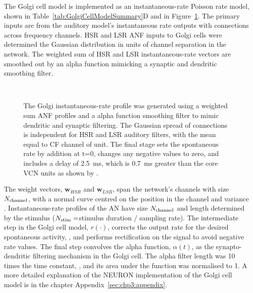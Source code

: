 % 

\smallskip{}

The Golgi cell model is implemented as an instantaneous-rate Poisson
 rate model, shown in Table~\ref{tab:GolgiCellModelSummary}D and in
 Figure~\ref{fig:GolgiDiagram}. The primary inputs are from the
 auditory model's instantaneous rate outputs with connections across
 frequency channels. HSR and LSR ANF inputs to Golgi cells were
 determined the Gaussian distribution in units of channel separation
 in the network. The weighted sum of HSR and LSR instantaneous-rate
 vectors are smoothed out by an alpha function mimicking a synaptic
 and dendritic smoothing filter.

 \begin{figure}[h!]
  \centering
  \\
  \caption{The Golgi instantaneous-rate profile was generated using a
    weighted sum ANF profiles and a alpha function smoothing filter to
    mimic dendritic and synaptic filtering. The Gaussian spread of
    connections is independent for HSR and LSR auditory filters, with
    the mean equal to CF channel of unit. The final stage sets the
    spontaneous rate by addition at t=0, changes any negative values
    to zero, and includes a delay of 2.5~ms, which is 0.7~ms greater
    than the core VCN units as shown by \citet{GhoshalKim:1997}.}
  \label{fig:GolgiDiagram}
 \end{figure}

\smallskip{}

The weight vectors, $\mathbf{w}_{HSR}$ and $\mathbf{w}_{LSR}$, span
the network's channels with size $N_{\rm channel}$, with a normal
curve centred on the position in the channel and variance
\sANFGLG\@. Instantaneous-rate profiles of the AN have size $N_{\rm
  channel}$ and length determined by the stimulus ($N_{\rm
  stim}=$stimulus duration / sampling rate).  The intermediate step in
the Golgi cell model, $r(\cdot)$, corrects the output rate for the
desired spontaneous activity, \Gspon, and performs rectification on
the signal to avoid negative rate values.  The final step convolves
the alpha function, $\alpha(t)$, as the synapto-dendritic filtering
mechanism in the Golgi cell. The alpha filter length was 10 times the
time constant, \Gtau, and its area under the function was normalised
to 1.  A more detailed explanation of the NEURON implementation of the
Golgi cell model is in the chapter
Appendix~\ref{sec:chp3:appendix}.  %

